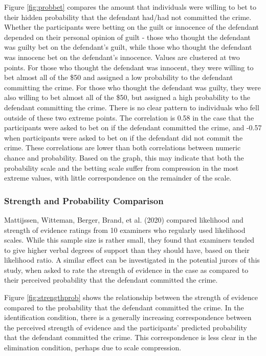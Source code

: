 \documentclass[print]{nuthesis}
\begin{document}
Figure \ref{fig:probbet} compares the amount that individuals were willing to bet to their hidden probability that the defendant had/had not committed the crime.
Whether the participants were betting on the guilt or innocence of the defendant depended on their personal opinion of guilt - those who thought the defendant was guilty bet on the defendant's guilt, while those who thought the defendant was innocenc bet on the defendant's innocence.
Values are clustered at two points.
For those who thought the defendant was innocent, they were willing to bet almost all of the \$50 and assigned a low probability to the defendant committing the crime.
For those who thought the defendant was guilty, they were also willing to bet almost all of the \$50, but assigned a high probability to the defendant committing the crime.
There is no clear pattern to individuals who fell outside of these two extreme points.
The correlation is 0.58 in the case that the participants were asked to bet on if the defendant committed the crime, and -0.57 when participants were asked to bet on if the defendant did not commit the crime.
These correlations are lower than both correlations between numeric chance and probability.
Based on the graph, this may indicate that both the probability scale and the betting scale suffer from compression in the most extreme values, with little correspondence on the remainder of the scale.

\hypertarget{strength-and-probability-comparison}{%
\subsubsection{Strength and Probability Comparison}\label{strength-and-probability-comparison}}

Mattijssen, Witteman, Berger, Brand, et al. (2020) compared likelihood and strength of evidence ratings from 10 examiners who regularly used likelihood scales.
While this sample size is rather small, they found that examiners tended to give higher verbal degrees of support than they should have, based on their likelihood ratio.
A similar effect can be investigated in the potential jurors of this study, when asked to rate the strength of evidence in the case as compared to their perceived probability that the defendant committed the crime.

Figure \ref{fig:strengthprob} shows the relationship between the strength of evidence compared to the probability that the defendant committed the crime.
In the identification condition, there is a generally increasing correspondence between the perceived strength of evidence and the participants' predicted probability that the defendant committed the crime.
This correspondence is less clear in the elimination condition, perhaps due to scale compression.
\end{document}
